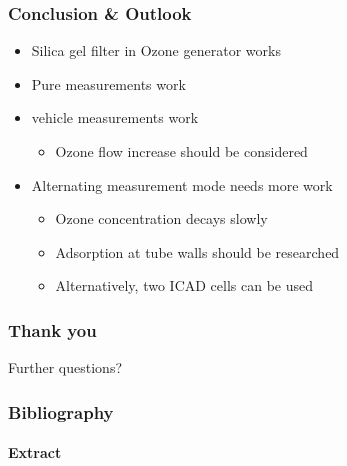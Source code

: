 \documentclass[english]{beamer}
\begin{document}

\begin{frame}
  \frametitle{Conclusion \& Outlook}
  \begin{itemize}
  \item Silica gel filter in Ozone generator works
  \item Pure  measurements work
  \item {} vehicle measurements work
    \begin{itemize}
    \item Ozone flow increase should be considered
    \end{itemize}
  \item Alternating measurement mode needs more work
    \begin{itemize}
    \item Ozone concentration decays slowly
    \item Adsorption at tube walls should be researched
    \item Alternatively, two ICAD cells can be used
    \end{itemize}
  \end{itemize}
\end{frame}

\begin{frame}
  \frametitle{Thank you}
  \centering
  Further questions?
\end{frame}

\nocite{*}
\begin{frame}
  \frametitle{Bibliography}
  \framesubtitle{Extract}
  \printbibliography{}
\end{frame}
\end{document}
